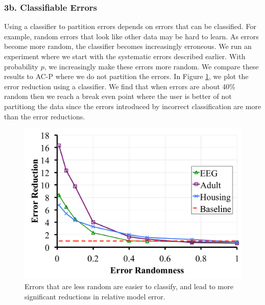 \subsubsection{3b. Classifiable Errors}
Using a classifier to partition errors depends on errors that can be classified.
For example, random errors that look like other data may be hard to learn.
As errors become more random, the classifier becomes increasingly erroneous.
We run an experiment where we start with the systematic errors described earlier.
With probability $p$, we increasingly make these errors more random.
We compare these results to AC-P where we do not partition the errors.
In Figure \ref{tradeoffs2}, we plot the error reduction using a classifier.
We find that when errors are about 40\% random then we reach a break even point
where the user is better of not partitiong the data since the errors introduced by incorrect classification are more than the error reductions.

\begin{figure}[ht!]
\centering
 \includegraphics[width=\columnwidth]{exp/exp5a.pdf}
 \caption{Errors that are less random are easier to classify, and lead to more significant reductions in relative model error. \label{tradeoffs2}}
\end{figure}


